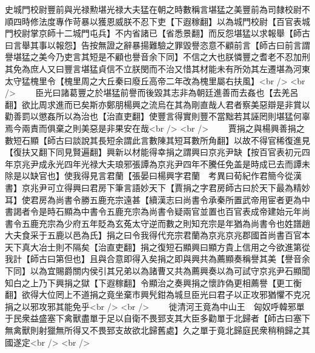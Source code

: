 史城門校尉豐前與光禄勲堪光禄大夫猛在朝之時數稱言堪猛之美豐前為司隸校尉不順四時修法度專作苛暴以獲恩威朕不忍下吏【下遐稼翻】以為城門校尉【百官表城門校尉掌京師十二城門屯兵】不内省諸已【省悉景翻】而反怨堪猛以求報舉【師古曰言舉其事以報怨】告按無證之辭暴揚難驗之罪毀譽恣意不顧前言【師古曰前言謂譽堪猛之美今乃吏言其短是不顧也譽音余下同】不信之大也朕憐豐之耆老不忍加刑其免為庶人又曰豐言堪猛貞信不立朕閔而不治又惜其材能未有所効其左遷堪為河東太守猛槐里令【槐里周之大丘秦曰廢丘高帝二年改為槐里屬右扶風】<br />
<br />
　　臣光曰諸葛豐之於堪猛前譽而後毀其志非為朝廷進善而去姦也【去羌呂翻】欲比周求進而已矣斯亦鄭朋楊興之流烏在其為剛直哉人君者察美惡辯是非賞以勸善罰以懲姦所以為治也【治直吏翻】使豐言得實則豐不當黜若其誣罔則堪猛何辜焉今兩責而俱棄之則美惡是非果安在哉<br />
<br />
　　賈捐之與楊興善捐之數短石顯【師古曰談說其長短余謂此言數陳其短耳數所角翻】以故不得官稀復進見【復扶又翻下同見賢遍翻】興新以材能得幸捐之謂興曰京兆尹缺【按百官表初元四年京兆尹成永光四年光禄大夫琅邪張譚為京兆尹四年不騰任免盖是時成已去而譚未除是以缺官也】使我得見言君蘭【張晏曰楊興字君蘭　考異曰荀紀作君簡今從漢書】京兆尹可立得興曰君房下筆言語妙天下【賈捐之字君房師古曰於天下最為精妙耳】使君房為尚書令勝五鹿充宗遠甚【續漢志曰尚書令承秦所置武帝用宦者更為中書謁者令是時石顯為中書令五鹿充宗為尚書令疑兩官並置也百官表成帝建始元年尚書令五鹿充宗為少府五年貶為玄菟太守逆而數之則知充宗是年猶為尚書令也姓譜趙大夫食采于五鹿以邑為氏】捐之曰令我得代充宗君蘭為京兆京兆郡國首尚書百官本天下真大冶士則不隔矣【治直吏翻】捐之復短石顯興曰顯方貴上信用之今欲進第從我計【師古曰第但也】且與合意即得入矣捐之即與興共為薦顯奏稱譽其美【譽音余下同】以為宜賜爵關内侯引其兄弟以為諸曹又共為薦興奏以為可試守京兆尹石顯聞知白之上乃下興捐之獄【下遐稼翻】令顯治之奏興捐之懷詐偽更相薦譽【更工衡翻】欲得大位罔上不道捐之竟坐棄市興髠鉗為城旦臣光曰君子以正攻邪猶懼不克况捐之以邪攻邪其能免乎<br />
<br />
　　徙清河王竟為中山王　匈奴呼韓邪單于民衆益盛塞下禽獸盡單于足以自衛不畏郅支其大臣多勸單于北歸者【師古曰塞下無禽獸則射獵無所得又不畏郅支故欲北歸舊處】久之單于竟北歸庭民衆稍稍歸之其國遂定<br />
<br />
